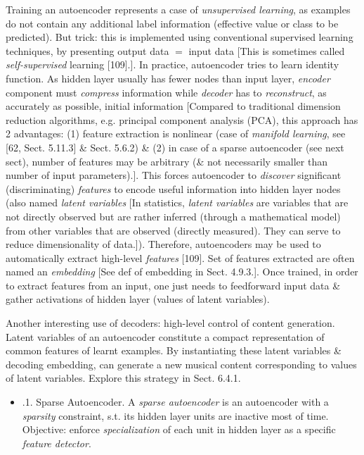 \documentclass{article}
\begin{document}
\begin{itemize}
\begin{itemize}
		Training an autoencoder represents a case of {\it unsupervised learning}, as examples do not contain any additional label information (effective value or class to be predicted). But trick: this is implemented using conventional supervised learning techniques, by presenting output data $=$ input data [This is sometimes called {\it self-supervised} learning [109].]. In practice, autoencoder tries to learn identity function. As hidden layer usually has fewer nodes than input layer, {\it encoder} component must {\it compress} information while {\it decoder} has to {\it reconstruct}, as accurately as possible, initial information [Compared to traditional dimension reduction algorithms, e.g. principal component analysis (PCA), this approach has 2 advantages: (1) feature extraction is nonlinear (case of {\it manifold learning}, see [62, Sect. 5.11.3] \& Sect. 5.6.2) \& (2) in case of a sparse autoencoder (see next sect), number of features may be arbitrary (\& not necessarily smaller than number of input parameters).]. This forces autoencoder to {\it discover} significant (discriminating) {\it features} to encode useful information into hidden layer nodes (also named {\it latent variables} [In statistics, {\it latent variables} are variables that are not directly observed but are rather inferred (through a mathematical model) from other variables that are observed (directly measured). They can serve to reduce dimensionality of data.]). Therefore, autoencoders may be used to automatically extract high-level {\it features} [109]. Set of features extracted are often named an {\it embedding} [See def of embedding in Sect. 4.9.3.]. Once trained, in order to extract features from an input, one just needs to feedforward input data \& gather activations of hidden layer (values of latent variables).

		Another interesting use of decoders: high-level control of content generation. Latent variables of an autoencoder constitute a compact representation of common features of learnt examples. By instantiating these latent variables \& decoding embedding, can generate a new musical content corresponding to values of latent variables. Explore this strategy in Sect. 6.4.1.
		\begin{itemize}
			\item {.1. Sparse Autoencoder.} A {\it sparse autoencoder} is an autoencoder with a {\it sparsity} constraint, s.t. its hidden layer units are inactive most of time. Objective: enforce {\it specialization} of each unit in hidden layer as a specific {\it feature detector}.


\end{itemize}
\end{itemize}
\end{itemize}
\end{document}
